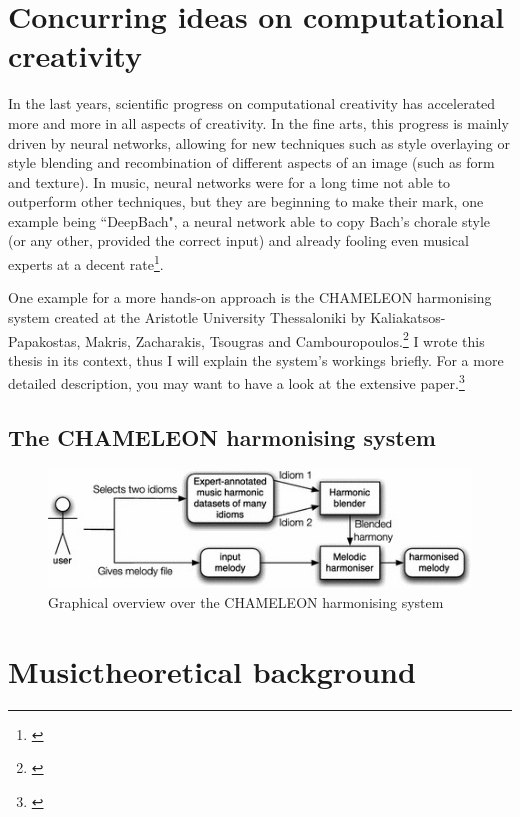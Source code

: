 \documentclass[a4paper,12pt]{report}
\begin{document}
\chapter{Concurring ideas on computational creativity}
In the last years, scientific progress on computational creativity has accelerated more and more in all aspects of creativity. In the fine arts, this progress is mainly driven by neural networks, allowing for new techniques such as style overlaying or style blending and recombination of different aspects of an image (such as form and texture). In music, neural networks were for a long time not able to outperform other techniques, but they are beginning to make their mark, one example being ``DeepBach", a neural network able to copy Bach's chorale style (or any other, provided the correct input) and already fooling even musical experts at a decent rate\footnote{\cite{hadjeres2016deepbach}}.

One example for a more hands-on approach is the CHAMELEON harmonising system created at the Aristotle University Thessaloniki by Kaliakatsos-Papakostas, Makris, Zacharakis, Tsougras and Cambouropoulos.\footnote{\cite{kaliakatsos2016overview}} I wrote this thesis in its context, thus I will explain the system's workings briefly. For a more detailed description, you may want to have a look at the extensive paper.\footnote{\cite{kaliakatsos2016learning}}

\newpage
\section{The CHAMELEON harmonising system}
\begin{figure}[h]
\centering
\includegraphics[scale=0.7]{Chameleon_overview.jpg}
\caption{Graphical overview over the CHAMELEON harmonising system}
\end{figure}


\chapter{Musictheoretical background}
\end{document}

